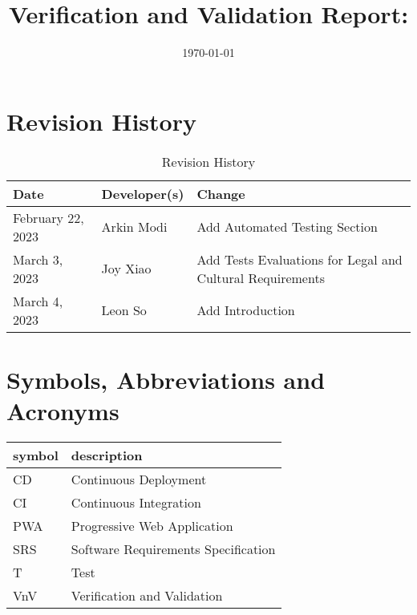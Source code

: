 \documentclass[12pt, titlepage]{article}
\begin{document}
\title{Verification and Validation Report: \progname}
\author{\authname}
\date{\today}

\maketitle


\section{Revision History}

\begin{table}[hp]
	\caption{Revision History} \label{TblRevisionHistory}
	\begin{tabularx}{\textwidth}{llX}
		\toprule
		\textbf{Date}     & \textbf{Developer(s)} & \textbf{Change}                                           \\
		\midrule
		February 22, 2023 & Arkin Modi            & Add Automated Testing Section                             \\
		March 3, 2023     & Joy Xiao              & Add Tests Evaluations for Legal and Cultural Requirements \\
		March 4, 2023     & Leon So               & Add Introduction                                          \\
		\bottomrule
	\end{tabularx}
\end{table}
\newpage

\section{Symbols, Abbreviations and Acronyms}

\renewcommand{\arraystretch}{1.2}
\begin{tabular}{l l}
	\toprule
	\textbf{symbol} & \textbf{description}                \\
	\midrule
	CD              & Continuous Deployment               \\
	CI              & Continuous Integration              \\
	PWA             & Progressive Web Application         \\
	SRS             & Software Requirements Specification \\
	T               & Test                                \\
	VnV             & Verification and Validation         \\
	\bottomrule
\end{tabular}\\
\end{document}
